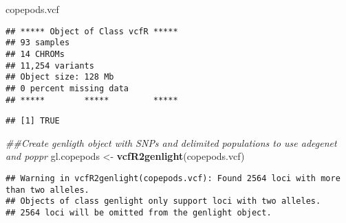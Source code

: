 \documentclass[]{article}
\newenvironment{Shaded}{\begin{snugshade}}{\end{snugshade}}
\newcommand{\CharTok}[1]{\textcolor[rgb]{0.31,0.60,0.02}{#1}}
\newcommand{\CommentTok}[1]{\textcolor[rgb]{0.56,0.35,0.01}{\textit{#1}}}
\newcommand{\DataTypeTok}[1]{\textcolor[rgb]{0.13,0.29,0.53}{#1}}
\newcommand{\DecValTok}[1]{\textcolor[rgb]{0.00,0.00,0.81}{#1}}
\newcommand{\KeywordTok}[1]{\textcolor[rgb]{0.13,0.29,0.53}{\textbf{#1}}}
\newcommand{\NormalTok}[1]{#1}
\newcommand{\OperatorTok}[1]{\textcolor[rgb]{0.81,0.36,0.00}{\textbf{#1}}}
\newcommand{\OtherTok}[1]{\textcolor[rgb]{0.56,0.35,0.01}{#1}}
\newcommand{\StringTok}[1]{\textcolor[rgb]{0.31,0.60,0.02}{#1}}
\begin{document}
\begin{Shaded}
\begin{Highlighting}[]
\NormalTok{copepods.vcf}
\end{Highlighting}
\end{Shaded}

\begin{verbatim}
## ***** Object of Class vcfR *****
## 93 samples
## 14 CHROMs
## 11,254 variants
## Object size: 128 Mb
## 0 percent missing data
## *****        *****         *****
\end{verbatim}

\begin{Shaded}
\end{Shaded}

\begin{verbatim}
## [1] TRUE
\end{verbatim}

\begin{Shaded}
\begin{Highlighting}[]
\CommentTok{##Create genligth object with SNPs and delimited populations to use adegenet and poppr}
\NormalTok{gl.copepods <-}\StringTok{ }\KeywordTok{vcfR2genlight}\NormalTok{(copepods.vcf)}
\end{Highlighting}
\end{Shaded}

\begin{verbatim}
## Warning in vcfR2genlight(copepods.vcf): Found 2564 loci with more than two alleles.
## Objects of class genlight only support loci with two alleles.
## 2564 loci will be omitted from the genlight object.
\end{verbatim}

\begin{Shaded}
\end{Shaded}
\end{document}
